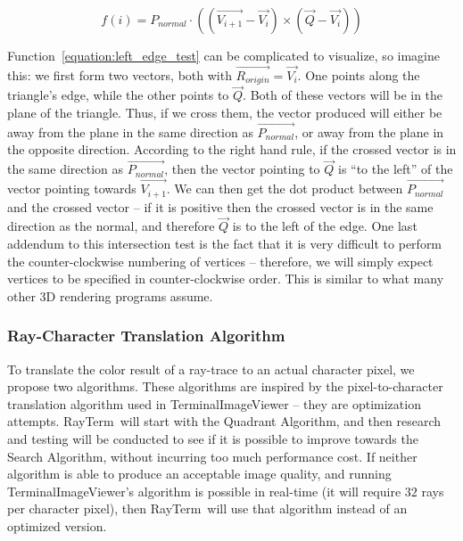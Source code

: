 \documentclass[11pt]{article}
\newcommand{\name}{{\sc RayTerm}}
\newcommand{\rayorg}{\vec{R_{origin}}}
\begin{document}
\begin{equation}
  \label{equation:left_edge_test}
  f(i) = P_{normal} \cdot ((\vec{V_{i+1}} - \vec{V_i}) \times (\vec{Q} - \vec{V_i}))
\end{equation}

Function~\ref{equation:left_edge_test} can be complicated to visualize, so imagine this: we first form two vectors, both with $\rayorg = \vec{V_i}$.
One points along the triangle's edge, while the other points to $\vec{Q}$.
Both of these vectors will be in the plane of the triangle.
Thus, if we cross them, the vector produced will either be away from the plane in the same direction as $\vec{P_{normal}}$, or away from the plane in the opposite direction.
According to the right hand rule, if the crossed vector is in the same direction as $\vec{P_{normal}}$, then the vector pointing to $\vec{Q}$ is ``to the left'' of the vector pointing towards $\vec{V_{i+1}}$.
We can then get the dot product between $\vec{P_{normal}}$ and the crossed vector -- if it is positive then the crossed vector is in the same direction as the normal, and therefore $\vec{Q}$ is to the left of the edge.
One last addendum to this intersection test is the fact that it is very difficult to perform the counter-clockwise numbering of vertices -- therefore, we will simply expect vertices to be specified in counter-clockwise order.
This is similar to what many other 3D rendering programs assume.

%

\subsubsection{Ray-Character Translation Algorithm}
\label{sec:method:ray_character_algorithm}

To translate the color result of a ray-trace to an actual character pixel, we propose two algorithms.
These algorithms are inspired by the pixel-to-character translation algorithm used in TerminalImageViewer \cite{tivGithub} -- they are optimization attempts.
\name\ will start with the Quadrant Algorithm, and then research and testing will be conducted to see if it is possible to improve towards the Search Algorithm, without incurring too much performance cost.
If neither algorithm is able to produce an acceptable image quality, and running TerminalImageViewer's algorithm is possible in real-time (it will require $32$ rays per character pixel), then \name\ will use that algorithm instead of an optimized version.
\end{document}
